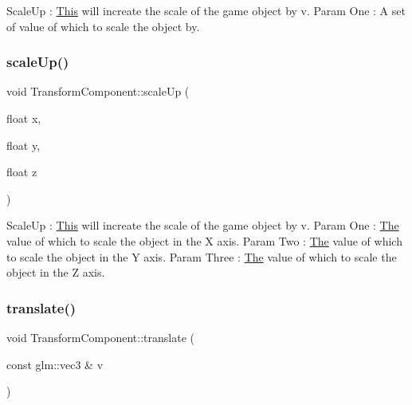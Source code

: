 Scale\+Up \+: \mbox{\hyperlink{class_this}{This}} will increate the scale of the game object by \textquotesingle{}v\textquotesingle{}. Param One \+: A set of value of which to scale the object by. \mbox{\label{class_transform_component_a161374892f674b2e6d34bcaeb66a2a28}} 
\subsubsection{\texorpdfstring{scale\+Up()}{scaleUp()}\hspace{0.1cm}{\footnotesize\ttfamily [2/2]}}
{\footnotesize\ttfamily void Transform\+Component\+::scale\+Up (\begin{DoxyParamCaption}\item[{float}]{x,  }\item[{float}]{y,  }\item[{float}]{z }\end{DoxyParamCaption})\hspace{0.3cm}{\ttfamily [inline]}}

Scale\+Up \+: \mbox{\hyperlink{class_this}{This}} will increate the scale of the game object by \textquotesingle{}v\textquotesingle{}. Param One \+: \mbox{\hyperlink{class_the}{The}} value of which to scale the object in the X axis. Param Two \+: \mbox{\hyperlink{class_the}{The}} value of which to scale the object in the Y axis. Param Three \+: \mbox{\hyperlink{class_the}{The}} value of which to scale the object in the Z axis. \mbox{\label{class_transform_component_af6ff15b431e0959b26714037f4b5e5e9}} 
\subsubsection{\texorpdfstring{translate()}{translate()}\hspace{0.1cm}{\footnotesize\ttfamily [1/2]}}
{\footnotesize\ttfamily void Transform\+Component\+::translate (\begin{DoxyParamCaption}\item[{const glm\+::vec3 \&}]{v }\end{DoxyParamCaption})\hspace{0.3cm}{\ttfamily [inline]}}

